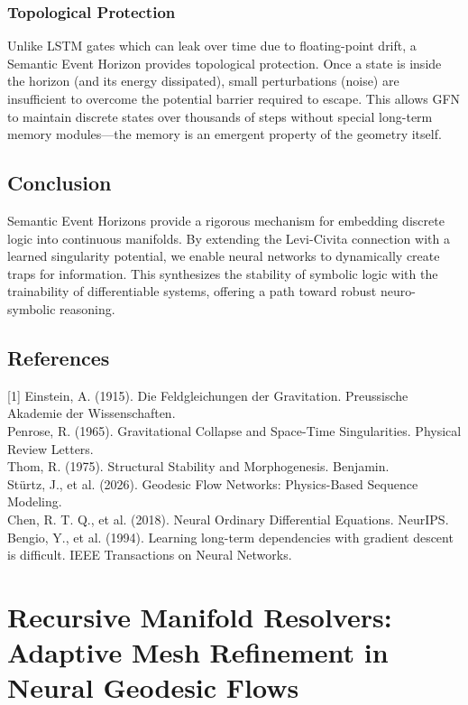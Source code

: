 \documentclass{article}
\numberwithin{equation}{section}
\begin{document}
\subsubsection{Topological Protection}
Unlike LSTM gates which can leak over time due to floating-point drift, a Semantic Event Horizon provides topological protection. Once a state is inside the horizon (and its energy dissipated), small perturbations (noise) are insufficient to overcome the potential barrier required to escape. This allows GFN to maintain discrete states over thousands of steps without special long-term memory modules---the memory is an emergent property of the geometry itself.

\subsection{Conclusion}
Semantic Event Horizons provide a rigorous mechanism for embedding discrete logic into continuous manifolds. By extending the Levi-Civita connection with a learned singularity potential, we enable neural networks to dynamically create traps for information. This synthesizes the stability of symbolic logic with the trainability of differentiable systems, offering a path toward robust neuro-symbolic reasoning.

\subsection*{References}
[1] Einstein, A. (1915). Die Feldgleichungen der Gravitation. Preussische Akademie der Wissenschaften.\\
[2] Penrose, R. (1965). Gravitational Collapse and Space-Time Singularities. Physical Review Letters.\\
[3] Thom, R. (1975). Structural Stability and Morphogenesis. Benjamin.\\
[4] Stürtz, J., et al. (2026). Geodesic Flow Networks: Physics-Based Sequence Modeling.\\
[5] Chen, R. T. Q., et al. (2018). Neural Ordinary Differential Equations. NeurIPS.\\
[6] Bengio, Y., et al. (1994). Learning long-term dependencies with gradient descent is difficult. IEEE Transactions on Neural Networks.

\section{Recursive Manifold Resolvers: Adaptive Mesh Refinement in Neural Geodesic Flows}
\end{document}
